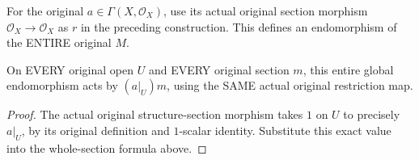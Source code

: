 \begin{definition}
\label{sc0-unit-scalar-action:global-scalar}
\leanok
For the original $a\in\Gamma(X,\mathcal O_X)$, use its actual original section
morphism $\mathcal O_X\to\mathcal O_X$ as $r$ in the preceding construction.
This defines an endomorphism of the ENTIRE original $M$.
\end{definition}

\begin{theorem}
\label{sc0-unit-scalar-action:global-formula}
\leanok
On EVERY original open $U$ and EVERY original section $m$, this entire global
endomorphism acts by $(a|_U)m$, using the SAME actual original restriction map.
\end{theorem}
\begin{proof}
The actual original structure-section morphism takes $1$ on $U$ to precisely
$a|_U$, by its original definition and $1$-scalar identity. Substitute this
exact value into the whole-section formula above.
\end{proof}
